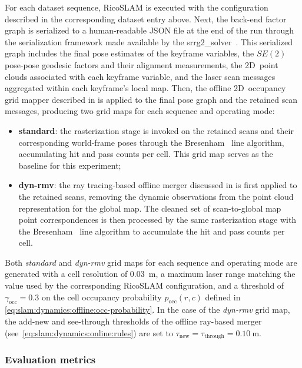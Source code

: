 For each dataset sequence, RicoSLAM is executed with the configuration
described in the corresponding dataset entry above. Next, the back-end factor
graph is serialized to a human-readable JSON file at the end of the run through
the serialization framework made available by the
srrg2\_solver~\cite{grisetti:robotics:2020}. This serialized graph includes
the final pose estimates of the keyframe variables, the $SE(2)$ pose-pose
geodesic factors and their alignment measurements, the 2D~point clouds
associated with each keyframe variable, and the laser scan messages
aggregated within each keyframe's local map.
Then, the offline 2D~occupancy grid mapper described in
 is applied to the final pose graph
and the retained scan messages, producing two grid maps for each sequence and
operating mode:
\begin{itemize}
\item \textbf{standard}: the rasterization stage is invoked on
      the retained scans and their corresponding world-frame poses through
      the Bresenham~\cite{bresenham:ibm:1965,zingl:uas:2016} line
      algorithm, accumulating hit and pass counts per cell.
      This grid map serves as the baseline for this experiment;
\item \textbf{dyn-rmv}: the ray tracing-based offline merger discussed in
       is first applied to the
      retained scans, removing the dynamic observations from the point cloud
      representation for the global map. The cleaned set of scan-to-global map
      point correspondences is then processed by the same rasterization stage
      with the Bresenham~\cite{bresenham:ibm:1965,zingl:uas:2016} line algorithm
      to accumulate the hit and pass counts per cell.
\end{itemize}

Both \emph{standard} and \emph{dyn-rmv} grid maps for each sequence and
operating mode are generated with a cell resolution of \SI{0.03}{\metre},
a maximum laser range matching the value used by the corresponding RicoSLAM
configuration, and a threshold of $\gamma_{\mathrm{occ}} = 0.3$ on the cell
occupancy probability $p_{\mathrm{occ}}(r,c)$ defined in
\eqref{eq:slam:dynamics:offline:occ-probability}.
In the case of the \emph{dyn-rmv} grid map, the add-new and see-through
thresholds of the offline ray-based merger
(see~\eqref{eq:slam:dynamics:online:rules}) are set to
$\tau_{\mathrm{new}} = \tau_{\mathrm{through}} = \SI{0.10}{\metre}$.

\subsubsection{Evaluation metrics}
\label{sec:slam:results:dynamics:metrics}


